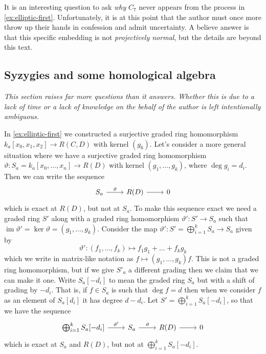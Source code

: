 \documentclass[10pt,notitlepage]{article}
\numberwithin{equation}{subsection}
\DeclareMathOperator{\im}{im}
\newcommand{\kazn}{k_a[x_0,\ldots,x_n]}
\newcommand{\kathree}{k_a[x_0,x_1,x_2]}
\begin{document}
        It is an interesting question to ask \emph{why} $C_7$ never appears from the process in \cref{ex:elliptic-first}.
        Unfortunately, it is at this point that the author must once more throw up their hands in confession and admit uncertainty.
        A believe answer is that this specific embedding is not \emph{projectively normal}, but the details are beyond this text.



    \subsection{Syzygies and some homological algebra} %
    \label{sub:syzygies_and_some_homological_algebra}

        \emph{This section raises far more questions than it answers.
        Whether this is due to a lack of time or a lack of knowledge on the behalf of the author is left intentionally ambiguous.}

        \bigskip

        In \cref{ex:elliptic-first} we constructed a surjective graded ring homomorphism $\kathree\to R(C,D)$ with kernel $(g_6)$.
        Let's consider a more general situation where we have a surjective graded ring homomorphism $\vartheta\colon S_a=\kazn\to R(D)$ with kernel $(g_1,\ldots,g_k)$, where $\deg g_i=d_i$.
        Then we can write the sequence
        \begin{equation*}
            \begin{tikzcd}
                S_a \rar{\vartheta}
                & R(D) \arrow{r}
                & 0
            \end{tikzcd}
        \end{equation*}
        which is exact at $R(D)$, but not at $S_a$.
        To make this sequence exact we need a graded ring $S'$ along with a graded ring homomorphism $\vartheta'\colon S'\to S_a$ such that $\im\vartheta'=\ker\vartheta=(g_1,\ldots,g_k)$.
        Consider the map $\vartheta'\colon S'=\bigoplus_{i=1}^k S_a\to S_a$ given by
        \[
            \vartheta'\colon(f_1,\ldots,f_k)\mapsto f_1g_1+\ldots+f_kg_k
        \]
        which we write in matrix-like notation as $f\mapsto (g_1,\ldots,g_k)f$.
        This is not a graded ring homomorphism, but if we give $S'_a$ a different grading then we claim that we can make it one.
        Write $S_a[-d_i]$ to mean the graded ring $S_a$ but with a shift of grading by $-d_i$.
        That is, if $f\in S_a$ is such that $\deg f=d$ then when we consider $f$ as an element of $S_a[d_i]$ it has degree $d-d_i$.
        Let $S'=\bigoplus_{i=1}^k S_a[-d_i]$, so that we have the sequence
        \begin{equation*}
            \begin{tikzcd}
                \bigoplus_{i=1}^k S_a[-d_i] \rar{\vartheta'}
                & S_a \rar{\vartheta}
                & R(D) \arrow{r}
                & 0
            \end{tikzcd}
        \end{equation*}
        which is exact at $S_a$ and $R(D)$, but not at $\bigoplus_{i=1}^k S_a[-d_i]$.
\end{document}
